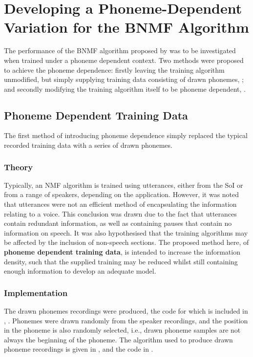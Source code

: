 \section{\label{sec:Develop-Phoneme-Dependent}Developing a Phoneme-Dependent
Variation for the \acl{BNMF} Algorithm}

The performance of the \ac{BNMF} algorithm proposed by \citet{mohammadiha2013supervised}
was to be investigated when trained under a phoneme dependent context.
Two methods were proposed to achieve the phoneme dependence: firstly
leaving the training algorithm unmodified, but simply supplying training
data consisting of drawn phonemes, \textbf{};
and secondly modifying the training algorithm itself to be phoneme
dependent, \textbf{}.


\subsection{\label{sub:Phoneme-Training}Phoneme Dependent Training Data}

The first method of introducing phoneme dependence simply replaced
the typical recorded training data with a series of drawn phonemes.


\subsubsection*{Theory}

Typically, an \ac{NMF} algorithm is trained using utterances, either
from the \ac{SoI} or from a range of speakers, depending on the application.
However, it was noted that utterances were not an efficient method
of encapsulating the information relating to a voice. This conclusion
was drawn due to the fact that utterances contain redundant information,
as well as containing pauses that contain no information on speech.
It was also hypothesised that the training algorithms may be affected
by the inclusion of non-speech sections. The proposed method here,
of \textbf{phoneme dependent training data}, is intended to increase
the information density, such that the supplied training may be reduced
whilst still containing enough information to develop an adequate
model.


\subsubsection*{Implementation}

The drawn phonemes recordings were produced, the code for which is
included in , \textit{}.
Phonemes were drawn randomly from the speaker recordings, and the
position in the phoneme is also randomly selected, i.e., drawn phoneme
samples are not always the beginning of the phoneme. The algorithm
used to produce drawn phoneme recordings is given in ,
and the code in .


